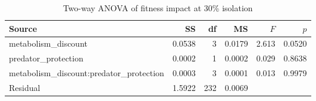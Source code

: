 \begin{table}[htbp]
\centering
\caption{Two-way ANOVA of fitness impact at 30\% isolation}
\begin{tabular}{lrrrrr}
\toprule
Source & SS & df & MS & $F$ & $p$ \\
\midrule
  metabolism\_discount & 0.0538 & 3 & 0.0179 & 2.613 & 0.0520 \\
  predator\_protection & 0.0002 & 1 & 0.0002 & 0.029 & 0.8638 \\
  metabolism\_discount:predator\_protection & 0.0003 & 3 & 0.0001 & 0.013 & 0.9979 \\
  Residual & 1.5922 & 232 & 0.0069 & & \\
\bottomrule
\end{tabular}
\end{table}